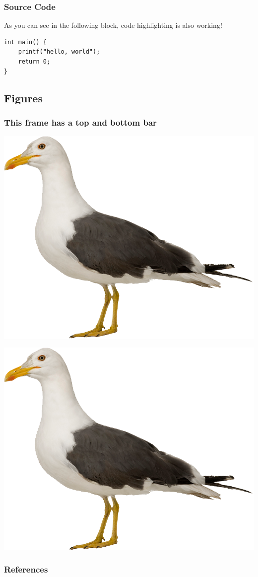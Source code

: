 \documentclass{technical_presentation}
\begin{document}
\begin{frame}[fragile]
	\frametitle{Source Code}
  	
  	 As you can see in the following block, code highlighting is also working!
  	 
  	 \begin{verbatim} 
int main() {
	printf("hello, world");
	return 0;
}
	\end{verbatim}
  	
\end{frame}


\subsection{Figures}

\begin{frame}
	\frametitle{This frame has a top and bottom bar}
	\centering
	\includegraphics[height=0.8\textheight]{figures/gull}
\end{frame}

\begin{frame}[plain]
	\centering
	\includegraphics[height=\textheight]{figures/gull}
\end{frame}
  



\appendix

\begin{frame}[allowframebreaks]
	\frametitle{References}
	\printbibliography[heading=bibintoc]
\end{frame}
\end{document}
